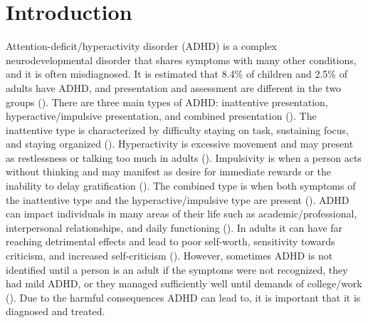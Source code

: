 \documentclass[,article,submit,moreauthors,pdftex]{mdpi}
\begin{document}

\hypertarget{introduction}{%
\section{Introduction}\label{introduction}}

Attention-deficit/hyperactivity disorder (ADHD) is a complex
neurodevelopmental disorder that shares symptoms with many other
conditions, and it is often misdiagnosed. It is estimated that 8.4\% of
children and 2.5\% of adults have ADHD, and presentation and assessment
are different in the two groups (\citet{noauthor_what_nodate}). There
are three main types of ADHD: inattentive presentation,
hyperactive/impulsive presentation, and combined presentation
(\citet{noauthor_what_nodate}). The inattentive type is characterized by
difficulty staying on task, sustaining focus, and staying organized
(\citet{noauthor_attention-deficithyperactivity_nodate}). Hyperactivity
is excessive movement and may present as restlessness or talking too
much in adults (\citet{noauthor_attention-deficithyperactivity_nodate}).
Impulsivity is when a person acts without thinking and may manifest as
desire for immediate rewards or the inability to delay gratification
(\citet{noauthor_attention-deficithyperactivity_nodate}). The combined
type is when both symptoms of the inattentive type and the
hyperactive/impulsive type are present
(\citet{noauthor_attention-deficithyperactivity_nodate}). ADHD can
impact individuals in many areas of their life such as
academic/professional, interpersonal relationships, and daily
functioning (\citet{noauthor_what_nodate}). In adults it can have far
reaching detrimental effects and lead to poor self-worth, sensitivity
towards criticism, and increased self-criticism
(\citet{noauthor_what_nodate}). However, sometimes ADHD is not
identified until a person is an adult if the symptoms were not
recognized, they had mild ADHD, or they managed sufficiently well until
demands of college/work
(\citet{noauthor_attention-deficithyperactivity_nodate2}). Due to the
harmful consequences ADHD can lead to, it is important that it is
diagnosed and treated.
\end{document}
